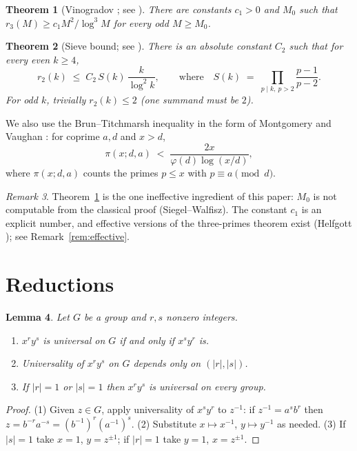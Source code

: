 \documentclass[11pt]{amsart}
\numberwithin{equation}{section}
\newtheorem{theorem}{Theorem}[section]
\newtheorem{lemma}[theorem]{Lemma}
\theoremstyle{remark}
\newtheorem{remark}[theorem]{Remark}
\begin{document}
\begin{theorem}[Vinogradov \cite{Vino}; see {\cite[Theorem~3.4]{Vaughan}}]
\label{thm:vino}
There are constants $c_1>0$ and $M_0$ such that $r_3(M)\ge c_1 M^2/\log^3 M$ for
every odd $M\ge M_0$.
\end{theorem}

\begin{theorem}[Sieve bound; see {\cite[Theorem~3.11]{HR}}]\label{thm:sieve}
There is an absolute constant $C_2$ such that for every even $k\ge 4$,
\[
r_2(k)\;\le\;C_2\,S(k)\,\frac{k}{\log^2 k},
\qquad\text{where}\quad
S(k)\;=\;\prod_{p\mid k,\ p>2}\frac{p-1}{p-2} .
\]
For odd $k$, trivially $r_2(k)\le 2$ (one summand must be $2$).
\end{theorem}

We also use the Brun--Titchmarsh inequality in the form of Montgomery and Vaughan
\cite[Theorem~2]{MV}: for coprime $a,d$ and $x>d$,
\begin{equation}\label{eq:BT}
\pi(x;d,a)\;<\;\frac{2x}{\varphi(d)\log(x/d)} ,
\end{equation}
where $\pi(x;d,a)$ counts the primes $p\le x$ with $p\equiv a\pmod d$.

\begin{remark}
Theorem~\ref{thm:vino} is the one ineffective ingredient of this paper: $M_0$ is
not computable from the classical proof (Siegel--Walfisz). The constant $c_1$ is
an explicit number, and effective versions of the three-primes theorem exist
(Helfgott \cite{Helfgott}); see Remark~\ref{rem:effective}.
\end{remark}

\section{Reductions}\label{sec:red}

\begin{lemma}\label{lem:red}
Let $G$ be a group and $r,s$ nonzero integers.
\begin{enumerate}
\item $x^ry^s$ is universal on $G$ if and only if $x^sy^r$ is.
\item Universality of $x^ry^s$ on $G$ depends only on $(|r|,|s|)$.
\item If $|r|=1$ or $|s|=1$ then $x^ry^s$ is universal on every group.
\end{enumerate}
\end{lemma}

\begin{proof}
(1) Given $z\in G$, apply universality of $x^sy^r$ to $z^{-1}$: if
$z^{-1}=a^sb^r$ then $z=b^{-r}a^{-s}=(b^{-1})^r(a^{-1})^s$. (2) Substitute
$x\mapsto x^{-1}$, $y\mapsto y^{-1}$ as needed. (3) If $|s|=1$ take $x=1$,
$y=z^{\pm1}$; if $|r|=1$ take $y=1$, $x=z^{\pm 1}$.
\end{proof}
\end{document}

